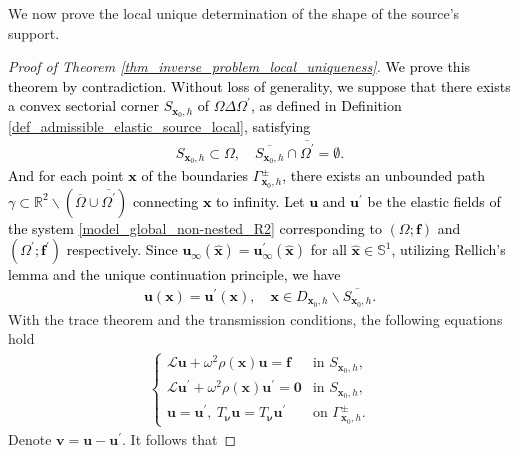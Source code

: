 \documentclass[11pt,reqno,oneside]{amsart}
\theoremstyle{definition}
\theoremstyle{remark}
\numberwithin{equation}{section}
\numberwithin{equation}{section}
\theoremstyle{remark}
\begin{document}
We now prove the local unique determination of the shape of the source's support.

\begin{proof}[Proof of Theorem \ref{thm_inverse_problem_local_uniqueness}]	
	
	\textcolor{black}{We prove this theorem by contradiction. Without loss of generality, we suppose that there exists a convex sectorial corner $ S_{\mathbf{x}_0,h} $ of $\Omega\Delta\Omega^{\prime}$, as defined in Definition \ref{def_admissible_elastic_source_local}, satisfying 
		\begin{align*}
			S_{\mathbf{x}_0,h}\subset\Omega, \quad \overline{S_{\mathbf{x}_0,h}}\cap\overline{\Omega^{\prime}}=\emptyset.
	\end{align*}
	And for each point $\mathbf{x}$ of the boundaries $ \Gamma_{\mathbf{x}_0,h}^\pm $, there exists an unbounded path $\gamma\subset\mathbb{R}^2\backslash\left(\overline{\Omega}\cup\overline{\Omega^\prime}\right)$ connecting $\mathbf{x}$ to infinity. Let $ \mathbf{u} $ and $ \mathbf{u}^{\prime} $ be the elastic fields of the system \eqref{model_global_non-nested_R2} corresponding to $ \left(\Omega; \mathbf{f}\right) $ and $ \left(\Omega^{\prime}; \mathbf{f}^{\prime}\right) $ respectively. Since $ \mathbf{u}_{\infty}\left(\hat{\mathbf{x}}\right) =\mathbf{u}_{\infty}^{\prime} \left(\hat{\mathbf{x}}\right) $ for all $ \hat{\mathbf{x}}\in\mathbb{S}^1 $, utilizing Rellich's lemma and the unique continuation principle, we have
	\begin{align*}
		\mathbf{u}\left(\mathbf{x}\right) = \mathbf{u}^{\prime}\left(\mathbf{x}\right), \quad \mathbf{x}\in D_{\mathbf{x}_0,h}\backslash\overline{S_{\mathbf{x}_0,h}}.
	\end{align*}}
	With the trace theorem and the transmission conditions, the following equations hold 
	\begin{align*} 
		\begin{cases}
			\mathcal{L} \mathbf{u} + \omega^2 \rho\left(\mathbf{x}\right) \mathbf{u} = \mathbf{f} & \text{in } S_{\mathbf{x}_0,h} , \\
			\mathcal{L} \mathbf{u}^{\prime} + \omega^2 \rho\left(\mathbf{x}\right) \mathbf{u}^{\prime} = \bm{0} & \text{in } S_{\mathbf{x}_0,h} , \\
			\mathbf{u} = \mathbf{u}^{\prime}, \ T_{\bm{\nu}} \mathbf{u}=T_{\bm{\nu}} \mathbf{u}^{\prime} & \text {on } \Gamma_{\mathbf{x}_0,h}^{\pm} .
		\end{cases}
	\end{align*}
	Denote $ \mathbf{v} = \mathbf{u} - \mathbf{u}^{\prime} $. It follows that

\end{proof}
\end{document}
